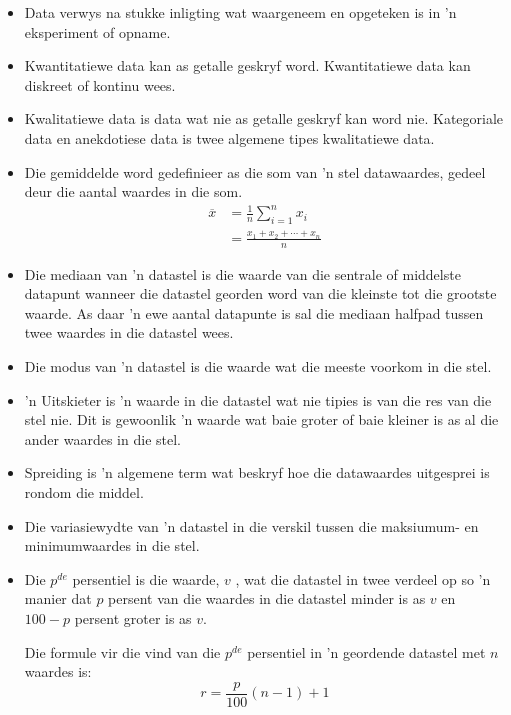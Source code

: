 \begin{itemize}[itemsep=6pt]
\item Data verwys na stukke inligting wat waargeneem en opgeteken is in ’n eksperiment of
opname. 

\item Kwantitatiewe data kan as getalle geskryf word. Kwantitatiewe data kan diskreet of kontinu wees.

\item Kwalitatiewe data is data wat nie as getalle geskryf kan word nie. Kategoriale data en anekdotiese data is twee algemene tipes kwalitatiewe data.

\item Die gemiddelde word gedefinieer as die som van ’n stel datawaardes, gedeel deur
die aantal waardes in die som. 
  \begin{align*}
    \overline{x} &= \frac{1}{n}\sum_{i=1}^n x_i \\
                 &= \frac{x_1 + x_2 + \cdots + x_n}{n}
  \end{align*}

\item Die mediaan van ’n datastel is die waarde van die sentrale of middelste datapunt
wanneer die datastel georden word van die kleinste tot die grootste waarde. As daar ’n ewe aantal datapunte is sal die mediaan halfpad tussen twee waardes in die datastel wees.
 

\item Die modus van ’n datastel is die waarde wat die meeste voorkom in die stel. 

\item ’n Uitskieter is ’n waarde in die datastel wat nie tipies is van die res van die stel
nie. Dit is gewoonlik ’n waarde wat baie groter of baie kleiner is as al die ander
waardes in die stel.

\item Spreiding is ’n algemene term wat beskryf hoe die datawaardes uitgesprei is rondom die middel.

\item Die variasiewydte van ’n datastel in die verskil tussen die maksiumum- en minimumwaardes in die stel. 

\item Die $p^{de}$ persentiel is die waarde, $v$ , wat die datastel in twee verdeel op so ’n manier dat $p$ persent van die waardes in die datastel minder is as $v$ en $100 − p$ persent groter is as $v$.


Die formule vir die vind van die $p^{de}$ persentiel in ’n geordende datastel met $n$ waardes is:
\begin{equation*}
  r = \frac{p}{100}\left(n-1\right)+1
\end{equation*}


\end{itemize}
